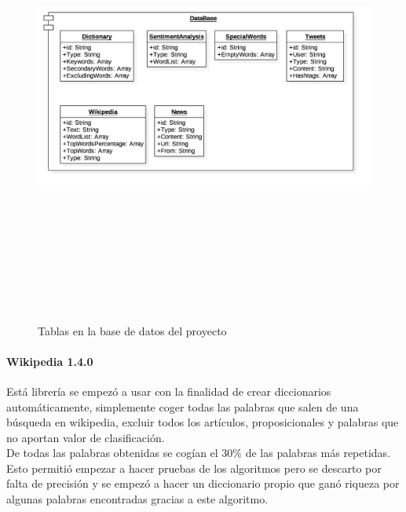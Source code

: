 \documentclass[../all.tex]{subfiles}
\begin{document}
        \begin{figure}[H]
        \centering
            \includegraphics[height=15cm, width=15cm]{imgs/DB.png}
            \caption{Tablas en la base de datos del proyecto}
        \end{figure}
	    \paragraph{Wikipedia 1.4.0}
		    Está librería se empezó a usar con la finalidad de crear diccionarios automáticamente, simplemente coger todas las palabras que salen de una búsqueda en wikipedia, excluir todos los artículos, proposicionales y palabras que no aportan valor de clasificación.\\
		    
		    De todas las palabras obtenidas se cogían el 30\% de las palabras más repetidas. Esto permitió empezar a hacer pruebas de los algoritmos pero se descarto por falta de precisión y se empezó a hacer un diccionario propio que ganó riqueza por algunas palabras encontradas gracias a este algoritmo.
    	\newpage
\end{document}
